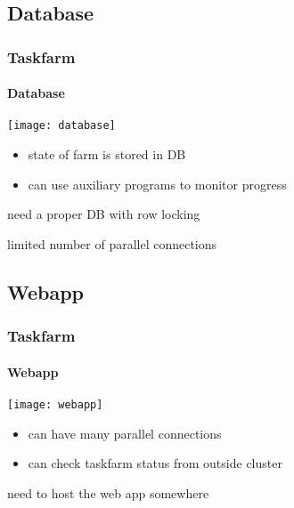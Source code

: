 \subsection{Database}
\begin{frame}
  \frametitle{Taskfarm}
  \framesubtitle{Database} 
    \begin{center}
      \begin{minipage}{0.7\textwidth}
        \texttt{[image: database]}
      \end{minipage}
  \end{center}
  \vfill
  \begin{minipage}[t][0.6\textheight][t]{\textwidth}
    \begin{description}
    \item<2->[good]
      \begin{itemize}
      \item state of farm is stored in DB
      \item can use auxiliary programs to monitor progress
      \end{itemize}
    \item<3->[bad] need a proper DB with row locking
    \item<4->[ugly] limited number of parallel connections
    \end{description}
  \end{minipage}
\end{frame}

\subsection{Webapp}
\begin{frame}
  \frametitle{Taskfarm}
  \framesubtitle{Webapp} 
    \begin{center}
      \begin{minipage}{0.7\textwidth}
        \texttt{[image: webapp]}
      \end{minipage}
  \end{center}
  \vfill
  \begin{minipage}[t][0.5\textheight][t]{\textwidth}
    \begin{description}
    \item<2->[good]
      \begin{itemize}
      \item can have many parallel connections
      \item can check taskfarm status from outside cluster
      \end{itemize}
    \item<3->[bad] need to host the web app somewhere
    \end{description}
  \end{minipage}
\end{frame}

